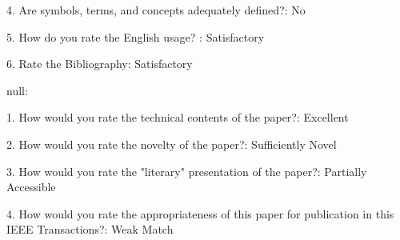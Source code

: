 4. Are symbols, terms, and concepts adequately defined?: No

5. How do you rate the English usage? : Satisfactory

6. Rate the Bibliography: Satisfactory

null: 

1. How would you rate the technical contents of the paper?: Excellent

2. How would you rate the novelty of the paper?: Sufficiently Novel

3. How would you rate the "literary" presentation of the paper?:
Partially Accessible

4. How would you rate the appropriateness of this paper for
publication in this IEEE Transactions?: Weak Match


